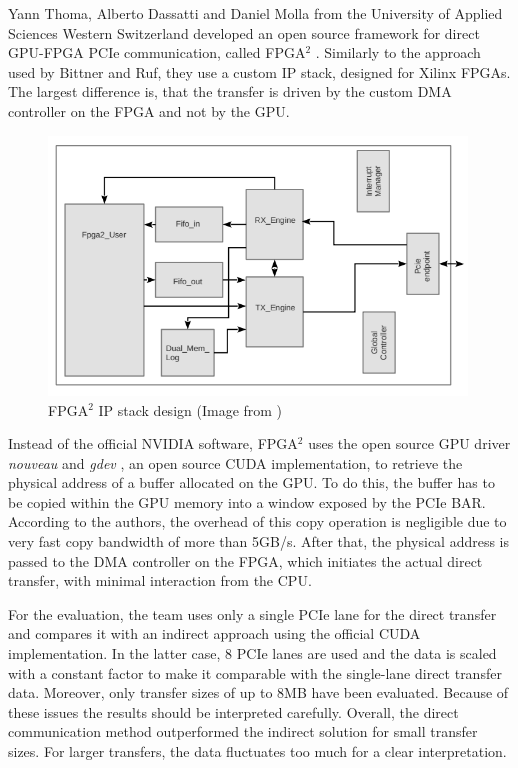 Yann Thoma, Alberto Dassatti and Daniel Molla from the University of Applied Sciences Western Switzerland developed an open source framework for direct GPU-FPGA PCIe communication, called FPGA$^2$ \cite{fpga2}.
Similarly to the approach used by Bittner and Ruf, they use a custom IP stack, designed for Xilinx FPGAs.
The largest difference is, that the transfer is driven by the custom DMA controller on the FPGA and not by the GPU.



\begin{figure}[htb]
	  \centerline{
		\includegraphics[width=0.99\textwidth]{images/fpga2stack.png}}
	  \caption{FPGA$^2$ IP stack design (Image from \cite{fpga2})}
	  \label{fig:speedypcie}
\end{figure}

Instead of the official NVIDIA software, FPGA$^2$ uses the open source GPU driver \emph{nouveau} \cite{nouveau} and \emph{gdev} \cite{gdev}, an open source CUDA implementation, to retrieve the physical address of a buffer allocated on the GPU.
To do this, the buffer has to be copied within the GPU memory into a window exposed by the PCIe BAR.
According to the authors, the overhead of this copy operation is negligible due to very fast copy bandwidth of more than 5GB/s.
After that, the physical address is passed to the DMA controller on the FPGA, which initiates the actual direct transfer, with minimal interaction from the CPU.

For the evaluation, the team uses only a single PCIe lane for the direct transfer and compares it with an indirect approach using the official CUDA implementation.
In the latter case, 8 PCIe lanes are used and the data is scaled with a constant factor to make it comparable with the single-lane direct transfer data.
Moreover, only transfer sizes of up to 8MB have been evaluated.
Because of these issues the results should be interpreted carefully.
Overall, the direct communication method outperformed the indirect solution for small transfer sizes.
For larger transfers, the data fluctuates too much for a clear interpretation.


